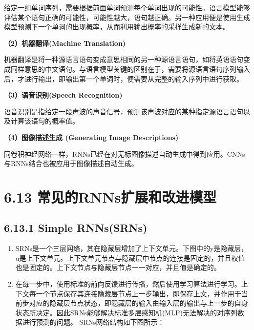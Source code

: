 ​
给定一组单词序列，需要根据前面单词预测每个单词出现的可能性。语言模型能够评估某个语句正确的可能性，可能性越大，语句越正确。另一种应用便是使用生成模型预测下一个单词的出现概率，从而利用输出概率的采样生成新的文本。

\textbf{（2）机器翻译(Machine Translation)}

​
机器翻译是将一种源语言语句变成意思相同的另一种源语言语句，如将英语语句变成同样意思的中文语句。与语言模型关键的区别在于，需要将源语言语句序列输入后，才进行输出，即输出第一个单词时，便需要从完整的输入序列中进行获取。

\textbf{（3）语音识别(Speech Recognition)}

​
语音识别是指给定一段声波的声音信号，预测该声波对应的某种指定源语言语句以及计算该语句的概率值。

\textbf{（4）图像描述生成 (Generating Image Descriptions)}

​
同卷积神经网络一样，RNNs已经在对无标图像描述自动生成中得到应用。CNNs与RNNs结合也被应用于图像描述自动生成。

\section{6.13
常见的RNNs扩展和改进模型}\label{ux5e38ux89c1ux7684rnnsux6269ux5c55ux548cux6539ux8fdbux6a21ux578b}

\subsection{6.13.1 Simple RNNs(SRNs)}\label{simple-rnnssrns}

\begin{enumerate}
\def\labelenumi{\arabic{enumi}.}
\item
  SRNs是一个三层网络，其在隐藏层增加了上下文单元。下图中的y是隐藏层，u是上下文单元。上下文单元节点与隐藏层中节点的连接是固定的，并且权值也是固定的。上下文节点与隐藏层节点一一对应，并且值是确定的。
\item
  在每一步中，使用标准的前向反馈进行传播，然后使用学习算法进行学习。上下文每一个节点保存其连接隐藏层节点上一步输出，即保存上文，并作用于当前步对应的隐藏层节点状态，即隐藏层的输入由输入层的输出与上一步的自身状态所决定。因此SRNs能够解决标准多层感知机(MLP)无法解决的对序列数据进行预测的问题。
  SRNs网络结构如下图所示：
\end{enumerate}


